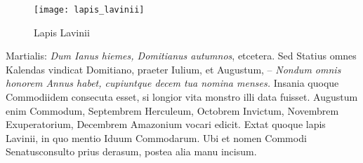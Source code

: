 %     
\begin{figure}[t]
  \centering
  \texttt{[image: lapis\_lavinii]}
  \caption{Lapis Lavinii}
  \label{fig:lapis_lavinii}
\end{figure}
Martialis:
 \textit{Dum Ianus hiemes, Domitianus
autumnos}, etcetera.
Sed Statius omnes
Kalendas vindicat Domitiano,
praeter Iulium, et Augustum,
– \textit{Nondum omnis honorem
Annus habet, cupiuntque decem tua
nomina menses.}
Insania quoque
Commodiidem consecuta esset, si
longior vita monstro illi data fuisset.
Augustum enim Commodum,
Septembrem Herculeum, Octobrem
Invictum, Novembrem
Exuperatorium, Decembrem
Amazonium vocari edicit.
Extat
quoque lapis Lavinii, in quo mentio
Iduum Commodarum.
Ubi et
nomen Commodi Senatusconsulto prius derasum, postea alia manu
incisum.

